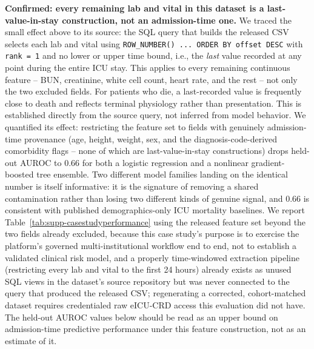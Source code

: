 \documentclass[10pt,a4paper]{article}
\begin{document}
\textbf{Confirmed: every remaining lab and vital in this dataset is a last-value-in-stay
construction, not an admission-time one.} We traced the small effect above to its
source: the SQL query that builds the released CSV selects each lab and vital using
\texttt{ROW\_NUMBER() ... ORDER BY offset DESC} with \texttt{rank = 1} and no lower or
upper time bound, i.e., the \emph{last} value recorded at any point during the entire
ICU stay. This applies to every remaining continuous feature -- BUN, creatinine, white
cell count, heart rate, and the rest -- not only the two excluded fields. For patients
who die, a last-recorded value is frequently close to death and reflects terminal
physiology rather than presentation. This is established directly from the source
query, not inferred from model behavior. We quantified its effect: restricting the
feature set to fields with genuinely admission-time provenance (age, height, weight,
sex, and the diagnosis-code-derived comorbidity flags -- none of which are
last-value-in-stay constructions) drops held-out AUROC to 0.66 for both a logistic
regression and a nonlinear gradient-boosted tree ensemble. Two different model
families landing on the identical number is itself informative: it is the signature
of removing a shared contamination rather than losing two different kinds of genuine
signal, and 0.66 is consistent with published demographics-only ICU mortality
baselines. We report Table~\ref{tab:supp-casestudyperformance} using the released feature
set beyond the two fields already excluded, because this case study's purpose is to
exercise the platform's governed multi-institutional workflow end to end, not to
establish a validated clinical risk model, and a properly time-windowed extraction
pipeline (restricting every lab and vital to the first 24 hours) already exists as
unused SQL views in the dataset's source repository but was never connected to the
query that produced the released CSV; regenerating a corrected, cohort-matched
dataset requires credentialed raw eICU-CRD access this evaluation did not have. The
held-out AUROC values below should be read as an upper bound on admission-time
predictive performance under this feature construction, not as an estimate of it.
\end{document}
